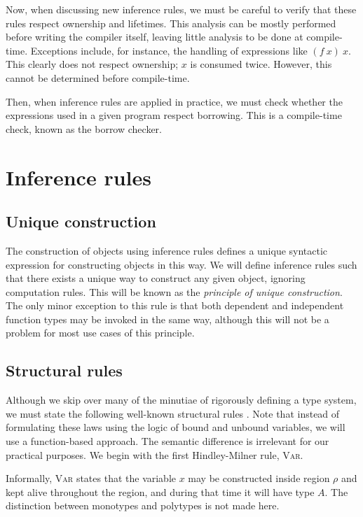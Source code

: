 \documentclass[11pt]{book}
\begin{document}
Now, when discussing new inference rules, we must be careful to verify that these rules respect ownership and lifetimes.
This analysis can be mostly performed before writing the compiler itself, leaving little analysis to be done at compile-time.
Exceptions include, for instance, the handling of expressions like \( (f\ x)\ x \).
This clearly does not respect ownership; \( x \) is consumed twice.
However, this cannot be determined before compile-time.

Then, when inference rules are applied in practice, we must check whether the expressions used in a given program respect borrowing.
This is a compile-time check, known as the borrow checker.

\section{Inference rules}

\subsection{Unique construction}

The construction of objects using inference rules defines a unique syntactic expression for constructing objects in this way.
We will define inference rules such that there exists a unique way to construct any given object, ignoring computation rules.
This will be known as the \textit{principle of unique construction}.
The only minor exception to this rule is that both dependent and independent function types may be invoked in the same way, although this will not be a problem for most use cases of this principle.

\subsection{Structural rules}

Although we skip over many of the minutiae of rigorously defining a type system, we must state the following well-known structural rules \cite{hottbook}.
Note that instead of formulating these laws using the logic of bound and unbound variables, we will use a function-based approach.
The semantic difference is irrelevant for our practical purposes.
We begin with the first Hindley-Milner rule, \textsc{Var}.
\begin{mathpar}
\end{mathpar}
Informally, \textsc{Var} states that the variable \( x \) may be constructed inside region \( \rho \) and kept alive throughout the region, and during that time it will have type \( A \).
The distinction between monotypes and polytypes is not made here.
\end{document}
